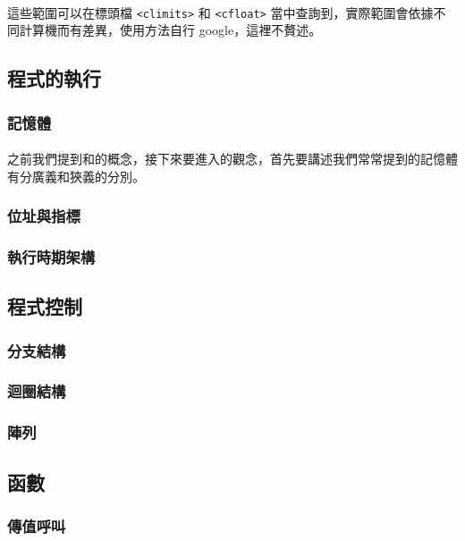 \documentclass[12pt,a4paper,oneside]{article}
\begin{document}
\begin{CJK}{UTF8}{bkai}
\paragraph{}這些範圍可以在標頭檔 \lstinline!<climits>! 和 \lstinline!<cfloat>! 當中查詢到，實際範圍會依據不同計算機而有差異，使用方法自行 google，這裡不贅述。

\subsection{程式的執行}

\subsubsection{記憶體}

\paragraph{}之前我們提到和的概念，接下來要進入的觀念，首先要講述我們常常提到的記憶體有分廣義和狹義的分別。

\subsubsection{位址與指標}
\subsubsection{執行時期架構}

\subsection{程式控制}

\subsubsection{分支結構}
\subsubsection{迴圈結構}
\subsubsection{陣列}

\subsection{函數}
\subsubsection{傳值呼叫}

\end{CJK}
\end{document}
